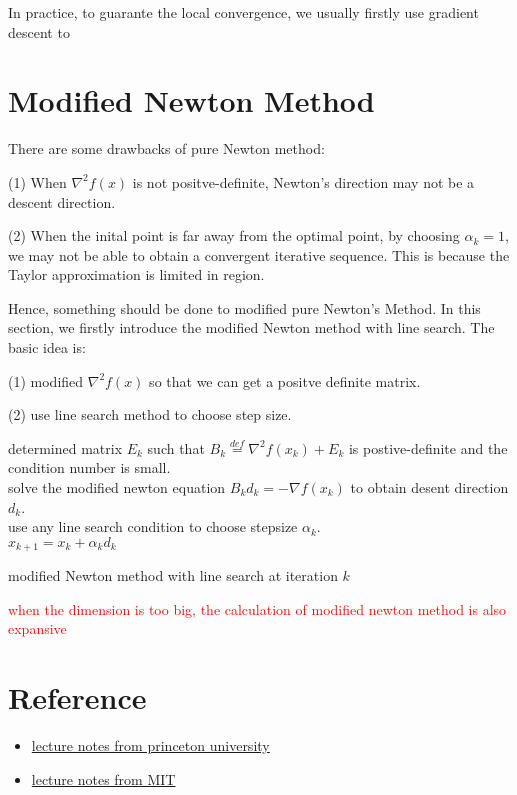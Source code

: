 In practice, to guarante the local convergence, we usually firstly use gradient descent to  

\section{Modified Newton Method}

There are some drawbacks of pure Newton method:
\par
(1) When $\nabla^2 f(x)$ is not positve-definite, Newton's direction may not be a descent direction.
\par
(2) When the inital point is far away from the optimal point, by choosing $\alpha_k=1$, we may not be able to obtain a convergent iterative sequence. 
This is because the Taylor approximation is limited in region.

\par 
Hence, something should be done to modified pure Newton's Method. 
In this section, we firstly introduce the modified Newton method with line search. 
The basic idea is: 
\par
(1) modified $\nabla^2 f(x)$ so that we can get a positve definite matrix. 
\par
(2) use line search method to choose step size.

\begin{algorithm}[H]
    \BlankLine
    determined matrix $E_k$ such that $B_k\overset{def}{=} \nabla^2 f(x_k) + E_k$ is postive-definite and the condition number is small. \\
    solve the modified newton equation $B_kd_k=-\nabla f(x_k)$ to obtain desent direction $d_k$.\\
    use any line search condition to choose stepsize $\alpha_k$.\\
    \Return $x_{k+1}=x_k+\alpha_k d_k$
    \caption{modified Newton method with line search at iteration $k$}
    \label{alg:mnmls}
\end{algorithm}

\textcolor{red}{when the dimension is too big, the calculation of modified newton method is also expansive}

\section{Reference}
\begin{itemize}
    \item \href{https://www.princeton.edu/~aaa/Public/Teaching/ORF363_COS323/F23/ORF363_COS323_F23_Lec9.pdf}{lecture notes from princeton university}
    \item \href{https://ocw.mit.edu/courses/15-084j-nonlinear-programming-spring-2004/83159d56de04a7e7dc94d0348fa4ccda_lec3_newton_mthd.pdf}{lecture notes from MIT}
\end{itemize}